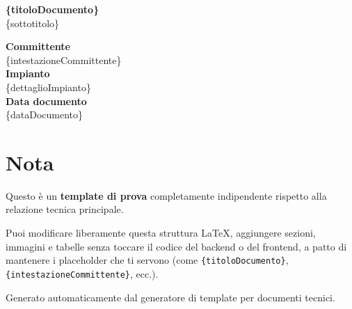 \documentclass[12pt,a4paper]{article}
\begin{document}
\begin{center}
  {\Large\bfseries \{titoloDocumento\}}\\[0.5cm]
  {\large \{sottotitolo\}}\\[1cm]
\end{center}

\noindent
\textbf{Committente}\\
\{intestazioneCommittente\}\\[0.25cm]

\noindent
\textbf{Impianto}\\
\{dettaglioImpianto\}\\[0.25cm]

\noindent
\textbf{Data documento}\\
\{dataDocumento\}\\[1cm]

\section*{Nota}

Questo è un \textbf{template di prova} completamente indipendente
rispetto alla relazione tecnica principale.

Puoi modificare liberamente questa struttura LaTeX,
aggiungere sezioni, immagini e tabelle senza toccare il codice
del backend o del frontend, a patto di mantenere i placeholder
che ti servono (come \verb|{titoloDocumento}|, \verb|{intestazioneCommittente}|, ecc.).

\vfill
\begin{center}
  {\small Generato automaticamente dal generatore di template per documenti tecnici.}
\end{center}
\end{document}
